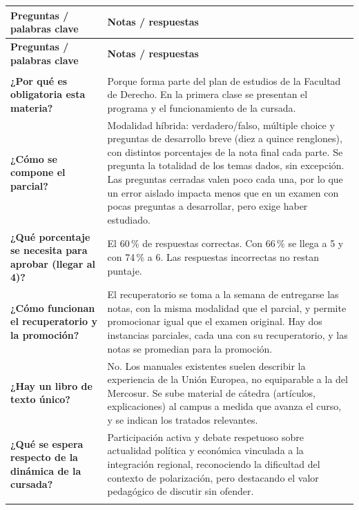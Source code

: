 \documentclass[12pt,oneside]{book}
\newlength{\cornizq}
\newlength{\cornder}
\newlength{\cornancho}
\newenvironment{cornell}
{%
    \small
    \renewcommand{\arraystretch}{1.3}%
    \begin{longtable}{>{\raggedright\arraybackslash}p{\cornizq}!{\vrule width 0.4pt}>{\raggedright\arraybackslash}p{\cornder}}
    \toprule
    \textbf{Preguntas / palabras clave} & \textbf{Notas / respuestas} \\
    \midrule
    \endfirsthead
    \toprule
    \textbf{Preguntas / palabras clave} & \textbf{Notas / respuestas} \\
    \midrule
    \endhead
    \midrule
    \multicolumn{2}{r}{\footnotesize\itshape continúa en la página siguiente} \\
    \endfoot
    \bottomrule
    \endlastfoot
}
{%
    \end{longtable}%
}
\begin{document}
\begin{cornell}
\textbf{¿Por qué es obligatoria esta materia?} &
Porque forma parte del plan de estudios de la Facultad de Derecho. En la primera clase se presentan el programa y el funcionamiento de la cursada. \\
\textbf{¿Cómo se compone el parcial?} &
Modalidad híbrida: verdadero/falso, múltiple choice y preguntas de desarrollo breve (diez a quince renglones), con distintos porcentajes de la nota final cada parte. Se pregunta la totalidad de los temas dados, sin excepción. Las preguntas cerradas valen poco cada una, por lo que un error aislado impacta menos que en un examen con pocas preguntas a desarrollar, pero exige haber estudiado. \\
\textbf{¿Qué porcentaje se necesita para aprobar (llegar al 4)?} &
El 60\,\% de respuestas correctas. Con 66\,\% se llega a 5 y con 74\,\% a 6. Las respuestas incorrectas no restan puntaje. \\
\textbf{¿Cómo funcionan el recuperatorio y la promoción?} &
El recuperatorio se toma a la semana de entregarse las notas, con la misma modalidad que el parcial, y permite promocionar igual que el examen original. Hay dos instancias parciales, cada una con su recuperatorio, y las notas se promedian para la promoción. \\
\textbf{¿Hay un libro de texto único?} &
No. Los manuales existentes suelen describir la experiencia de la Unión Europea, no equiparable a la del Mercosur. Se sube material de cátedra (artículos, explicaciones) al campus a medida que avanza el curso, y se indican los tratados relevantes. \\
\textbf{¿Qué se espera respecto de la dinámica de la cursada?} &
Participación activa y debate respetuoso sobre actualidad política y económica vinculada a la integración regional, reconociendo la dificultad del contexto de polarización, pero destacando el valor pedagógico de discutir sin ofender. \\
\midrule
{} \\
\end{cornell}
\end{document}

